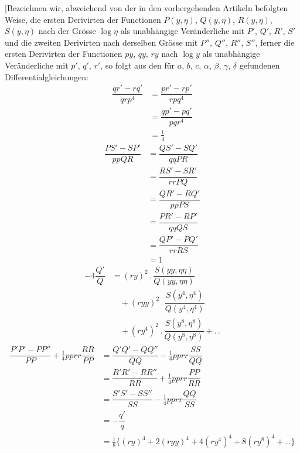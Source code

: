 [Bezeichnen wir, abweichend von der in den vorhergehenden Artikeln befolgten
Weise, die ersten Derivirten der Functionen $P(y,\allowbreak \eta)$, $Q(y,\allowbreak \eta)$, $R(y,\allowbreak \eta)$,
$S(y,\allowbreak \eta)$ nach der Grösse $\log\eta$ als unabhängige Veränderliche mit
$P'$, $Q'$, $R'$, $S'$ und die zweiten Derivirten nach derselben Grösse mit
$P''$, $Q''$, $R''$, $S''$, ferner die ersten Derivirten der Functionen
$py$, $qy$, $ry$ nach $\log y$ als unabhängige Veränderliche mit $p'$, $q'$, $r'$,
so folgt aus den für $a$, $b$, $c$, $\alpha$, $\beta$, $\gamma$, $\delta$ gefundenen
Differentialgleichungen:
\[
\begin{aligned}\dfrac{qr'-rq'}{qrp^4}&=\dfrac{pr'-rp'}{rpq^4}
 \\[7pt]&=\dfrac{qp'-pq'}{pqr^4}\\[7pt]&=\tfrac14\end{aligned}
\]
\[
\begin{aligned}\dfrac{PS'-SP'}{ppQR}&=\dfrac{QS'-SQ'}{qqPR}
 \\[7pt]&=\dfrac{RS'-SR'}{rrPQ}\\[7pt]&=\dfrac{QR'-RQ'}{ppPS}
 \\[7pt]&=\dfrac{PR'-RP'}{qqQS}\\[7pt]&=\dfrac{QP'-PQ'}{rrRS}\\[7pt]&=1\end{aligned}
\]
\[
\begin{aligned}-4\dfrac{Q'}Q&=(ry)^2\mathbin{.}\dfrac{S(yy,\eta\eta)}{Q(yy,\eta\eta)}\\[6pt]&\quad{}+
(ryy)^2\mathbin{.}\dfrac{S(y^4,\eta^4)}{Q(y^4,\eta^4)}\\[6pt]&\quad{}+
(ry^4)^2\mathbin{.}\dfrac{S(y^8,\eta^8)}{Q(y^8,\eta^8)}+\mathord{.}\,\mathord{.}\end{aligned}
\]
\[
\begin{aligned}
\dfrac{P'P'-PP''}{PP}+\tfrac14pprr\dfrac{RR}{PP}
 &=\dfrac{Q'Q'-QQ''}{QQ}-\tfrac14pprr\dfrac{SS}{QQ}
\\[8pt]&=\dfrac{R'R'-RR''}{RR}+\tfrac14pprr\dfrac{PP}{RR}
 \\[8pt]&=\dfrac{S'S'-SS''}{SS}-\tfrac14pprr\dfrac{QQ}{SS}
\\[8pt]&=-\dfrac{q'}q\\[8pt]&=\tfrac18\{(ry)^4+2(ryy)^4+4(ry^4)^4+8(ry^8)^4+\mathord{.}\,\mathord{.}\}
\end{aligned}
\]


